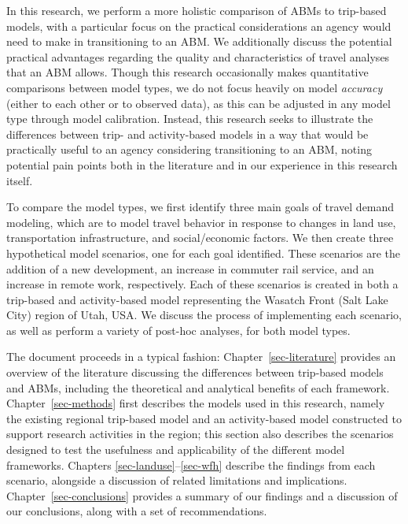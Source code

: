 \documentclass[fancy, oneside, mastersfancy, ms]{byuthesis}
\begin{document}
In this research, we perform a more holistic comparison of ABMs to
trip-based models, with a particular focus on the practical
considerations an agency would need to make in transitioning to an ABM.
We additionally discuss the potential practical advantages regarding the
quality and characteristics of travel analyses that an ABM allows.
Though this research occasionally makes quantitative comparisons between
model types, we do not focus heavily on model \emph{accuracy} (either to
each other or to observed data), as this can be adjusted in any model
type through model calibration. Instead, this research seeks to
illustrate the differences between trip- and activity-based models in a
way that would be practically useful to an agency considering
transitioning to an ABM, noting potential pain points both in the
literature and in our experience in this research itself.

To compare the model types, we first identify three main goals of travel
demand modeling, which are to model travel behavior in response to
changes in land use, transportation infrastructure, and social/economic
factors. We then create three hypothetical model scenarios, one for each
goal identified. These scenarios are the addition of a new development,
an increase in commuter rail service, and an increase in remote work,
respectively. Each of these scenarios is created in both a trip-based
and activity-based model representing the Wasatch Front (Salt Lake City)
region of Utah, USA. We discuss the process of implementing each
scenario, as well as perform a variety of post-hoc analyses, for both
model types.

The document proceeds in a typical fashion: Chapter~\ref{sec-literature}
provides an overview of the literature discussing the differences
between trip-based models and ABMs, including the theoretical and
analytical benefits of each framework. Chapter~\ref{sec-methods} first
describes the models used in this research, namely the existing regional
trip-based model and an activity-based model constructed to support
research activities in the region; this section also describes the
scenarios designed to test the usefulness and applicability of the
different model frameworks. Chapters \ref{sec-landuse}--\ref{sec-wfh}
describe the findings from each scenario, alongside a discussion of
related limitations and implications. Chapter~\ref{sec-conclusions}
provides a summary of our findings and a discussion of our conclusions,
along with a set of recommendations.

\end{document}
